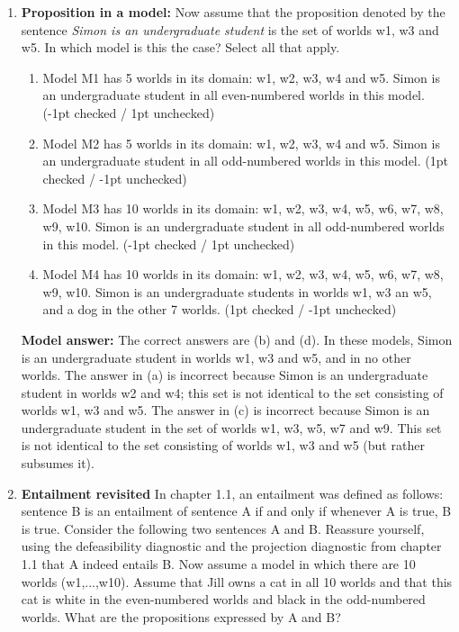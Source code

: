 \documentclass[a4,11pt]{article}
\begin{document}
\begin{enumerate}[leftmargin = 12pt]
 
      \item {\bf Proposition in a model:}  Now assume that the proposition denoted by the sentence  \textit{Simon is an undergraduate student} is the set of worlds w1, w3 and w5. In which model is this the case? Select all that apply. 
            
       \begin{enumerate}[noitemsep]
       \item Model M1 has 5 worlds in its domain: w1, w2, w3, w4 and w5. Simon is an undergraduate student in all even-numbered worlds in this model. (-1pt checked / 1pt unchecked)
       \item Model M2 has 5 worlds in its domain: w1, w2, w3, w4 and w5. Simon is an undergraduate student in all odd-numbered worlds in this model. (1pt checked / -1pt unchecked)
       \item Model M3 has 10 worlds in its domain: w1, w2, w3, w4, w5, w6, w7, w8, w9, w10. Simon is an undergraduate student in all odd-numbered worlds in this model. (-1pt checked / 1pt unchecked) 
       \item Model M4 has 10 worlds in its domain: w1, w2, w3, w4, w5, w6, w7, w8, w9, w10. Simon is an undergraduate students in worlds w1, w3 an w5, and a dog in the other 7 worlds. (1pt checked / -1pt unchecked)
    \end{enumerate}     
  
 {\bf Model answer:} The correct answers are (b) and (d). In these models, Simon is an undergraduate student in worlds w1, w3 and w5, and in no other worlds. The answer in (a) is incorrect because Simon is an undergraduate student in worlds w2 and w4; this set is not identical to the set consisting of worlds w1, w3 and w5. The answer in (c) is incorrect because Simon is an undergraduate student in the set of worlds w1, w3, w5, w7 and w9. This set is not identical to the set consisting of worlds w1, w3 and w5 (but rather subsumes it). 
         
\item {\bf Entailment revisited} In chapter 1.1, an entailment was defined as follows: sentence B is an entailment of sentence A if and only if whenever A is true, B is true. Consider the following two sentences A and B. Reassure yourself, using the defeasibility diagnostic and the projection diagnostic from chapter 1.1 that A indeed entails B.  Now assume a model in which there are 10 worlds (w1,...,w10). Assume that Jill owns a cat in all 10 worlds and that this cat is white in the even-numbered worlds and black in the odd-numbered worlds. What are the propositions expressed by A and B?


\end{enumerate}
\end{document}
